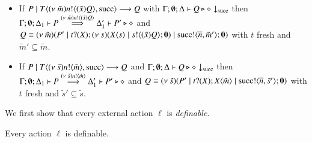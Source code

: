 \begin{definition}[Definibility]
\begin{itemize}
		\item	If $P \;|\; T\langle (\nu\ \tilde{m})n ! \langle (\tilde{x})Q \rangle, \textrm{succ} \rangle \longrightarrow Q$
			with $\Gamma; \emptyset; \Delta \vdash Q \triangleright \diamond \downarrow_{\textrm{succ}}$ then
			$\Gamma; \emptyset; \Delta_1 \vdash P \stackrel{(\nu\ \tilde{m})n ! \langle (\tilde{x})Q \rangle}{\Longrightarrow} \Delta_1' \vdash P' \triangleright \diamond$
			and $Q \equiv (\nu\ \tilde{m})(P' \;|\; t ? (X) ; (\nu\ s)(X\langle s \rangle \;|\; s ! \langle (\tilde{x}) Q \rangle ; \mathbf{0}) \;|\; \textrm{succ} ! \langle \overline{n}, \tilde{m}' \rangle ; \mathbf{0})$
			with $t$ fresh and $\tilde{m}' \subseteq \tilde{m}$.

		\item	If $P \;|\; T\langle (\nu\ \tilde{s})n ! \langle \tilde{m} \rangle, \textrm{succ} \rangle \longrightarrow Q $
			and $\Gamma; \emptyset; \Delta \vdash Q \triangleright \diamond \downarrow_{\textrm{succ}}$ then
			$\Gamma; \emptyset; \Delta_1 \vdash P \stackrel{(\nu\ \tilde{s})n ! \langle \tilde{m} \rangle}{\Longrightarrow} \Delta_1' \vdash P' \triangleright \diamond$
			and $Q \equiv (\nu\ \tilde{s})(P' \;|\; t ? (X) ; X\langle \tilde{m} \rangle \;|\; \textrm{succ} ! \langle \overline{n}, \tilde{s}' \rangle ; \mathbf{0})$
			with $t$ fresh and $\tilde{s}' \subseteq \tilde{s}$.


	\end{itemize}	
%
\end{definition}

We first show that every external action $\ell$ is {\em definable}.

\begin{lemma}[Definibility]
	\label{lem:definibility}
	Every action $\ell$ is definable.
\end{lemma}

